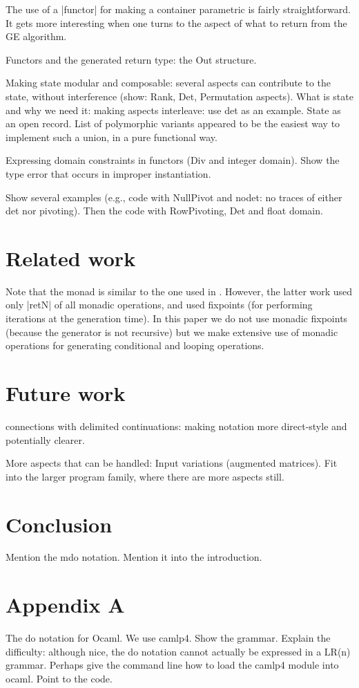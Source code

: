 \documentclass{llncs}
\begin{document}
The use of a |functor| for making a container parametric is fairly 
straightforward.  It gets more interesting when one turns to the aspect
of what to return from the GE algorithm.

Functors and the generated return type: the Out structure.

Making state modular and composable: several aspects can contribute
to the state, without interference (show: Rank, Det, Permutation
aspects).
What is state and why we need it: making aspects interleave: use det
as an example. State as an open record. List of polymorphic variants
appeared to be the easiest way to implement such a union, in a pure
functional way.

Expressing domain constraints in functors (Div and integer domain).
Show the type error that occurs in improper instantiation.

Show several examples (e.g., code with NullPivot and nodet: no traces
of either det nor pivoting). Then the code with RowPivoting, Det and
float domain.

\section{Related work}\label{related}

Note that the monad is similar to the one used in \cite{KiselyovTaha}.
However, the latter work used only |retN| of all monadic operations,
and used fixpoints (for performing iterations at the generation time).
In this paper we do not use monadic fixpoints (because the generator
is not recursive) but we make extensive use of monadic operations for
generating conditional and looping operations.

\section{Future work}\label{future}
connections with delimited continuations: making notation
more direct-style and potentially clearer.

More aspects that can be handled: Input variations (augmented
matrices). Fit into the larger program family, where there are
more aspects still.

\section{Conclusion}\label{conclusion}

Mention the mdo notation. Mention it into the introduction.




\section{Appendix A}
The do notation for Ocaml.
We use camlp4. Show the grammar. Explain the difficulty: although
nice, the do notation cannot actually be expressed in a LR(n) grammar.
Perhaps give the command line how to load the camlp4 module into
ocaml. Point to the code.
\end{document}
